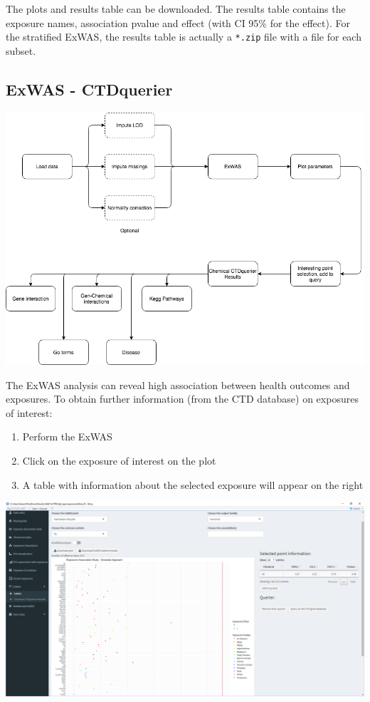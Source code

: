 \documentclass[
]{book}
\providecommand{\tightlist}{%
  \setlength{\itemsep}{0pt}\setlength{\parskip}{0pt}}
\begin{document}
The plots and results table can be downloaded. The results table contains the exposure names, association pvalue and effect (with CI 95\% for the effect). For the stratified ExWAS, the results table is actually a \texttt{*.zip} file with a file for each subset.

\hypertarget{exwas---ctdquerier}{%
\subsection{ExWAS - CTDquerier}\label{exwas---ctdquerier}}

\includegraphics{images/analysis7_3.png}

The ExWAS analysis can reveal high association between health outcomes and exposures. To obtain further information (from the CTD database) on exposures of interest:

\begin{enumerate}
\def\labelenumi{\arabic{enumi}.}
\tightlist
\item
  Perform the ExWAS
\item
  Click on the exposure of interest on the plot
\item
  A table with information about the selected exposure will appear on the right
\end{enumerate}

\includegraphics{images/analysis7_4.png}
\end{document}
